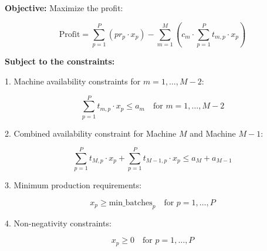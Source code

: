 \documentclass{article}
\begin{document}
\textbf{Objective:} Maximize the profit:

\[
\text{Profit} = \sum_{p=1}^{P} \left( pr_p \cdot x_p \right) - \sum_{m=1}^{M} \left( c_m \cdot \sum_{p=1}^{P} t_{m,p} \cdot x_p \right)
\]

\textbf{Subject to the constraints:}

1. Machine availability constraints for \( m = 1, \ldots, M-2 \):

\[
\sum_{p=1}^{P} t_{m,p} \cdot x_p \leq a_m \quad \text{for } m = 1, \ldots, M-2
\]

2. Combined availability constraint for Machine \( M \) and Machine \( M-1 \):

\[
\sum_{p=1}^{P} t_{M,p} \cdot x_p + \sum_{p=1}^{P} t_{M-1,p} \cdot x_p \leq a_M + a_{M-1}
\]

3. Minimum production requirements:

\[
x_p \geq \text{min\_batches}_p \quad \text{for } p = 1, \ldots, P
\]

4. Non-negativity constraints:

\[
x_p \geq 0 \quad \text{for } p = 1, \ldots, P
\]
\end{document}
